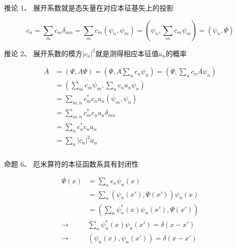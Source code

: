 \begin{frame} 
    \begin{exampleblock}{推论 1、}
        展开系数就是态矢量在对应本征基矢上的投影
    \end{exampleblock}
    \begin{equation*}
        c_n=\sum_m c_m\delta_{nm} = \sum_m c_m(\psi_n, \psi_m)= (\psi_n, \sum_m c_m\psi_m) =(\psi_n, \Psi)
    \end{equation*}
\end{frame} 

\begin{frame} 
    \begin{exampleblock}{推论 2、}
        展开系数的模方$|c_n|^2$就是测得相应本征值$a_n$的概率
    \end{exampleblock}
    \begin{equation*}
        \begin{split}
            \bar{A}&=(\Psi, A\Psi)=(\Psi, A\sum_n c_n \psi_{n})=(\Psi, \sum_n c_n A\psi_{n})\\
            &=(\sum_m c_m \psi_{m}, \sum_n c_n a_n \psi_{n})\\
            &=\sum_{m,n} c_m^* c_n a_n (\psi_m, \psi_n)\\
            &=\sum_{m,n} c_m^* c_n a_n \delta_{mn} \\
            &=\sum_{n} c_n^* c_n a_n  \\
            &=\sum_{n} |c_n|^2 a_n 
        \end{split}
    \end{equation*}
\end{frame} 

\begin{frame} [allowframebreaks=]
    \frametitle{}
    \begin{tcolorbox1}{命题 6、}
        厄米算符的本征函数系具有封闭性
     \end{tcolorbox1}
    \begin{equation*}
        \begin{split}
            \Psi(x)&=\sum_n c_n \psi_{n}(x) \\
            &=\sum_n (\psi_n(x'), \Psi(x')) \psi_{n}(x)\\
            &= (\sum_n\psi_{n} ^* (x)\psi_n(x'), \Psi(x')) \\
            \to &\sum_n\psi_{n} ^* (x)\psi_n(x')=\delta(x-x')\\
            \to &(\psi_{n}(x),\psi_n(x'))=\delta(x-x')
        \end{split} 
    \end{equation*}
\end{frame} 

